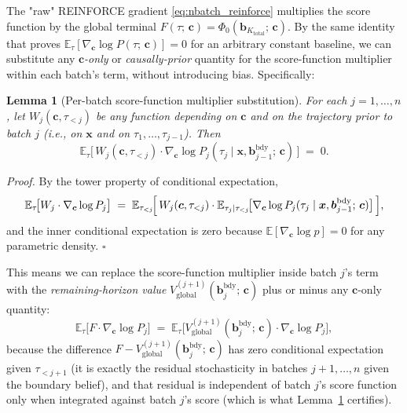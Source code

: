 \documentclass[11pt,a4paper]{article}
\newcommand{\bc}{\bm{c}}
\newcommand{\bx}{\bm{x}}
\newcommand{\bb}{\bm{b}}
\newcommand{\E}{\mathbb{E}}
\newtheorem{lemma}{Lemma}
\begin{document}
The "raw" REINFORCE gradient \eqref{eq:nbatch_reinforce} multiplies the score function by
the global terminal $F(\tau;\, \bc) = \Phi_0(\bb_{K_\mathrm{total}};\, \bc)$.  By the same
identity that proves $\E_\tau[\nabla_{\bc} \log P(\tau;\, \bc)] = 0$ for an arbitrary
constant baseline, we can substitute any \emph{$\bc$-only} or \emph{causally-prior}
quantity for the score-function multiplier within each batch's term, without introducing
bias.  Specifically:
\begin{lemma}[Per-batch score-function multiplier substitution]
\label{lem:perbatch_substitution}
For each $j = 1, \ldots, n$, let $W_j(\bc, \tau_{<j})$ be any function depending on $\bc$
and on the trajectory \emph{prior} to batch $j$ (i.e., on $\bx$ and on
$\tau_1, \ldots, \tau_{j-1}$).  Then
\begin{equation}
\E_{\tau} \bigl[\,W_j(\bc, \tau_{<j}) \cdot \nabla_{\bc} \log P_j(\tau_j \mid \bx, \bb^{\mathrm{bdy}}_{j-1};\, \bc)\,\bigr] \;=\; 0.
\end{equation}
\end{lemma}

\noindent\emph{Proof.}  By the tower property of conditional expectation,
\[
\E_{\tau}\!\bigl[W_j \cdot \nabla_{\bc} \log P_j\bigr]
\;=\;
\E_{\tau_{<j}}\!\Bigl[\,W_j(\bc, \tau_{<j}) \cdot \E_{\tau_j \mid \tau_{<j}}\!\bigl[\nabla_{\bc} \log P_j(\tau_j \mid \bx, \bb^{\mathrm{bdy}}_{j-1};\, \bc)\bigr]\,\Bigr],
\]
and the inner conditional expectation is zero because $\E[\nabla_{\bc} \log p] = 0$ for any
parametric density.  $\square$

\medskip

This means we can replace the score-function multiplier inside batch $j$'s term with the
\emph{remaining-horizon value} $V_{\mathrm{global}}^{(j+1)}(\bb^{\mathrm{bdy}}_j;\, \bc)$
plus or minus any $\bc$-only quantity:
\begin{equation}
\E_\tau\bigl[F \cdot \nabla_{\bc} \log P_j\bigr]
\;=\;
\E_\tau\bigl[V_{\mathrm{global}}^{(j+1)}(\bb^{\mathrm{bdy}}_j;\, \bc) \cdot \nabla_{\bc} \log P_j\bigr],
\label{eq:perbatch_value_substitution}
\end{equation}
because the difference $F - V_{\mathrm{global}}^{(j+1)}(\bb^{\mathrm{bdy}}_j;\, \bc)$ has
zero conditional expectation given $\tau_{<j+1}$ (it is exactly the residual stochasticity
in batches $j+1, \ldots, n$ given the boundary belief), and that residual is independent of
batch $j$'s score function only when integrated against batch $j$'s score (which is what
Lemma~\ref{lem:perbatch_substitution} certifies).
\end{document}
